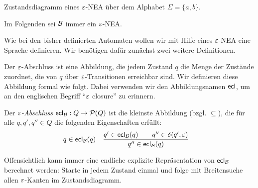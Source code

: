 \begin{Bsp}\label{bsp2.EpsNeaEx} 
   Zustandsdiagramm eines $\varepsilon$-NEA über dem Alphabet $\Sigma=\{a,b\}$.
   \begin{center}
   \end{center}
\end{Bsp}

Im Folgenden sei $\mathcal{B}$ immer ein $\varepsilon$-NEA.

Wie bei den bisher definierten Automaten wollen wir mit Hilfe eines $\varepsilon$-NEA eine Sprache definieren.
Wir benötigen dafür zunächst zwei weitere Definitionen.

Der $\varepsilon$-Abschluss ist eine Abbildung, die jedem Zustand $q$ die Menge der Zustände zuordnet, die von $q$ über $\varepsilon$-Transitionen erreichbar sind.
Wir definieren diese Abbildung formal wie folgt. Dabei verwenden wir den Abbildungsnamen $\textsf{ecl}$, um an den englischen Begriff "`$\varepsilon$ closure"' zu erinnern.
\begin{Def}
 Der \emph{$\varepsilon$-Abschluss} $\textsf{ecl}_{\mathcal{B}}:Q\rightarrow\mathcal{P}(Q)$ ist die kleinste Abbildung (bzgl. $\subseteq$), die für alle $q,q',q''\in Q$ die folgenden Eigenschaften erfüllt:
 \begin{align*}
   & q\in\textsf{ecl}_{\mathcal{B}}(q)
   &
   & \frac{q'\in\textsf{ecl}_{\mathcal{B}}(q) \qquad q''\in\delta(q',\varepsilon)}{q''\in\textsf{ecl}_{\mathcal{B}}(q)}
 \end{align*}
\end{Def}
Offensichtlich kann immer eine endliche explizite Repräsentation von $\textsf{ecl}_{\mathcal{B}}$ berechnet werden: Starte in jedem Zustand einmal und folge mit Breitensuche allen $\varepsilon$-Kanten im Zustandsdiagramm.

